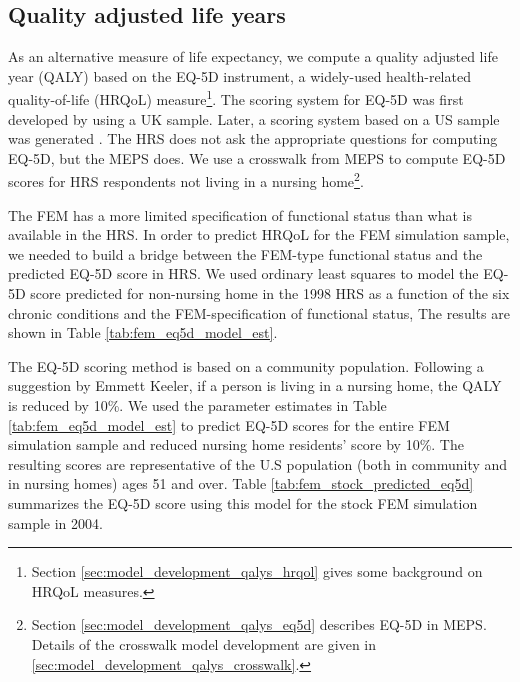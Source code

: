 \subsection{Quality adjusted life years}
\label{sec:estimation_qalys}

As an alternative measure of life expectancy, we compute a quality adjusted life 
year (QALY) based on the EQ-5D instrument, a widely-used health-related 
quality-of-life (HRQoL) measure\footnote{Section 
\ref{sec:model_development_qalys_hrqol} gives some background on HRQoL 
measures.}. The scoring system for EQ-5D was first developed by 
\citet{dolan1997modeling} using a UK sample. Later, a scoring system based on 
a US sample was generated \citep{shaw2005us}. The HRS does not ask the 
appropriate questions for computing EQ-5D, but the MEPS does.  
We use a crosswalk from MEPS to compute EQ-5D scores for HRS respondents not 
living in a nursing home\footnote{Section \ref{sec:model_development_qalys_eq5d} 
describes EQ-5D in MEPS. Details of the crosswalk model development are given 
in \ref{sec:model_development_qalys_crosswalk}.}. 

The FEM has a more limited specification of functional status than what is available in the HRS. In order to predict 
HRQoL for the FEM simulation sample, we needed to build a bridge between the FEM-type functional status and the 
predicted EQ-5D score in HRS.  We used ordinary least squares to model the EQ-5D score predicted for non-nursing 
home in the 1998 HRS as a function of the six chronic conditions and the FEM-specification of functional status, 
The results are shown in Table \ref{tab:fem_eq5d_model_est}. 

The EQ-5D scoring method is based on a community population.  Following a 
suggestion by Emmett Keeler, if a person is living in a nursing home, the QALY is 
reduced by 10\%.  We used the parameter estimates in Table 
\ref{tab:fem_eq5d_model_est} to predict EQ-5D scores for the entire FEM simulation sample 
and reduced nursing home residents' score by 10\%.  The resulting scores are representative of 
the U.S population (both in community and in nursing homes) ages 51 and over.  
Table \ref{tab:fem_stock_predicted_eq5d} summarizes the EQ-5D score using this 
model for the stock FEM simulation sample in 2004. 






